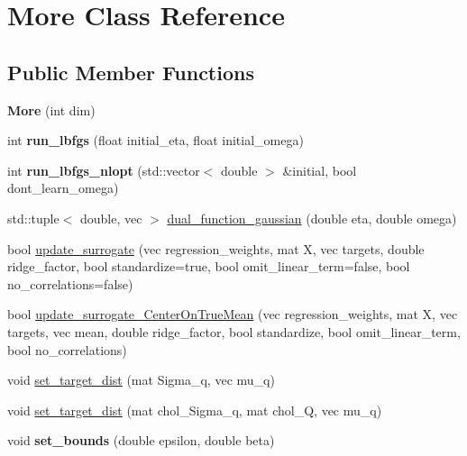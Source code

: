 \hypertarget{classMore}{}\section{More Class Reference}
\label{classMore}
\subsection*{Public Member Functions}
\begin{DoxyCompactItemize}
\item 
{\bfseries More} (int dim)\hypertarget{classMore_a4d5e29a878e515129484d2a04738ed4f}{}\label{classMore_a4d5e29a878e515129484d2a04738ed4f}

\item 
int {\bfseries run\+\_\+lbfgs} (float initial\+\_\+eta, float initial\+\_\+omega)\hypertarget{classMore_a1deae43fa72d7ce2ef34dd10cc44a75f}{}\label{classMore_a1deae43fa72d7ce2ef34dd10cc44a75f}

\item 
int {\bfseries run\+\_\+lbfgs\+\_\+nlopt} (std\+::vector$<$ double $>$ \&initial, bool dont\+\_\+learn\+\_\+omega)\hypertarget{classMore_aafcaa1a9dd299715349391a9092691ad}{}\label{classMore_aafcaa1a9dd299715349391a9092691ad}

\item 
std\+::tuple$<$ double, vec $>$ \hyperlink{classMore_aa3fdb202ca291e253f7c157d8a13040b}{dual\+\_\+function\+\_\+gaussian} (double eta, double omega)
\item 
bool \hyperlink{classMore_ab33950a4fa62de6b3f247c544e13fe59}{update\+\_\+surrogate} (vec regression\+\_\+weights, mat X, vec targets, double ridge\+\_\+factor, bool standardize=true, bool omit\+\_\+linear\+\_\+term=false, bool no\+\_\+correlations=false)
\item 
bool \hyperlink{classMore_a79f14b01eafe1c3b2966ee6a6cb157eb}{update\+\_\+surrogate\+\_\+\+Center\+On\+True\+Mean} (vec regression\+\_\+weights, mat X, vec targets, vec mean, double ridge\+\_\+factor, bool standardize, bool omit\+\_\+linear\+\_\+term, bool no\+\_\+correlations)
\item 
void \hyperlink{classMore_a7163e4cb11467ccbdb76b830a193c597}{set\+\_\+target\+\_\+dist} (mat Sigma\+\_\+q, vec mu\+\_\+q)
\item 
void \hyperlink{classMore_a52a17e3a77606659aeb668ad597aac62}{set\+\_\+target\+\_\+dist} (mat chol\+\_\+\+Sigma\+\_\+q, mat chol\+\_\+Q, vec mu\+\_\+q)
\item 
void {\bfseries set\+\_\+bounds} (double epsilon, double beta)\hypertarget{classMore_a67b66cbfcc08b37d6781f7887fccbfbf}{}\label{classMore_a67b66cbfcc08b37d6781f7887fccbfbf}


\end{DoxyCompactItemize}
